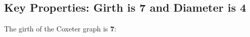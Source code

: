 \documentclass[12pt,a4paper,openany]{book}
\begin{document}
\medskip


\subsection*{Key Properties: Girth is 7 and Diameter is 4}

    \noindent The girth of the Coxeter graph is \textbf{7}:
    
\end{document}
